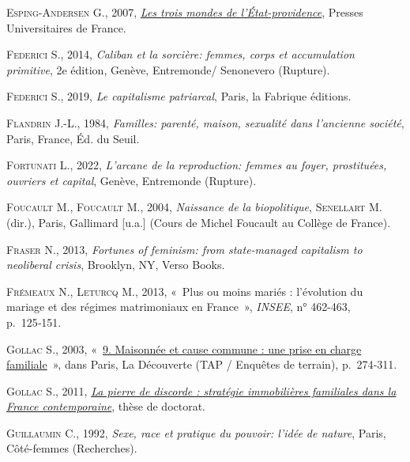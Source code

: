 \documentclass[
  12pt,
]{book}
\newlength{\cslhangindent}
\newenvironment{CSLReferences}[2] %
 {\begin{list}{}{%
  \setlength{\itemindent}{0pt}
  \setlength{\leftmargin}{0pt}
  \setlength{\parsep}{0pt}
  \ifodd #1
   \setlength{\leftmargin}{\cslhangindent}
   \setlength{\itemindent}{-1\cslhangindent}
  \fi
  \setlength{\itemsep}{#2\baselineskip}}}
 {\end{list}}
\begin{document}
\begin{CSLReferences}{0}{1}
\textsc{Esping-Andersen G.}, 2007,
\emph{\href{https://www.cairn.info/les-trois-mondes-de-l-etat-providence--9782130559160.htm}{Les
trois mondes de l'État-providence}}, Presses Universitaires de France.

\textsc{Federici S.}, 2014, \emph{Caliban et la sorcière: femmes, corps
et accumulation primitive}, 2e édition, Genève, Entremonde/ Senonevero
(Rupture).

\textsc{Federici S.}, 2019, \emph{Le capitalisme patriarcal}, Paris, la
Fabrique éditions.

\textsc{Flandrin J.-L.}, 1984, \emph{Familles: parenté, maison,
sexualité dans l'ancienne société}, Paris, France, Éd. du Seuil.

\textsc{Fortunati L.}, 2022, \emph{L'arcane de la reproduction: femmes
au foyer, prostituées, ouvriers et capital}, Genève, Entremonde
(Rupture).

\textsc{Foucault M.}, \textsc{Foucault M.}, 2004, \emph{Naissance de la
biopolitique}, \textsc{Senellart M.} (dir.), Paris, Gallimard {[}u.a.{]}
(Cours de Michel Foucault au Collège de France).

\textsc{Fraser N.}, 2013, \emph{Fortunes of feminism: from state-managed
capitalism to neoliberal crisis}, Brooklyn, NY, Verso Books.

\textsc{Frémeaux N.}, \textsc{Leturcq M.}, 2013, {«~Plus ou moins mariés
: l{'}évolution du mariage et des régimes matrimoniaux en France~»},
\emph{INSEE}, n° 462-463, p.~125‑151.

\textsc{Gollac S.}, 2003,
{«~\href{https://www.cairn.info/charges-de-famille--9782707141347-p-274.htm}{9.
Maisonnée et cause commune : une prise en charge familiale}~»}, dans
Paris, La Découverte (TAP / Enquêtes de terrain), p.~274‑311.

\textsc{Gollac S.}, 2011, \emph{\href{https://theses.fr/2011EHES0045}{La
pierre de discorde : stratégie immobilières familiales dans la France
contemporaine}}, thèse de doctorat.

\textsc{Guillaumin C.}, 1992, \emph{Sexe, race et pratique du pouvoir:
l'idée de nature}, Paris, Côté-femmes (Recherches).


\end{CSLReferences}
\end{document}
